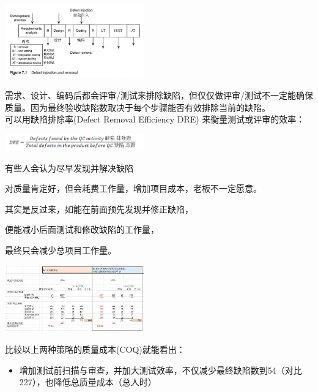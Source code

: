 \includegraphics[width=6cm]{Jaloteemm110.png}

需求、设计、编码后都会评审/测试来排除缺陷，但仅仅做评审/测试不一定能确保质量。因为最终验收缺陷数取决于每个步骤能否有效排除当前的缺陷。\\

可以用缺陷排除率(Defect Removal Efficiency DRE) 来衡量测试或评审的效率：



\includegraphics[width=6cm]{Ma3_10.png}

有些人会认为尽早发现并解决缺陷

对质量肯定好，但会耗费工作量，增加项目成本，老板不一定愿意。

其实是反过来，如能在前面预先发现并修正缺陷，

便能减小后面测试和修改缺陷的工作量，

最终只会减少总项目工作量。

\includegraphics[width=6cm]{AR1FixVarCostScreenshot_2022-12-10_144400.jpg}

比较以上两种策略的质量成本(COQ)就能看出：

\begin{itemize}
\tightlist
\item
  增加测试前扫描与审查，并加大测试效率，不仅减少最终缺陷数到54（对比227），也降低总质量成本（总人时）
\end{itemize}

